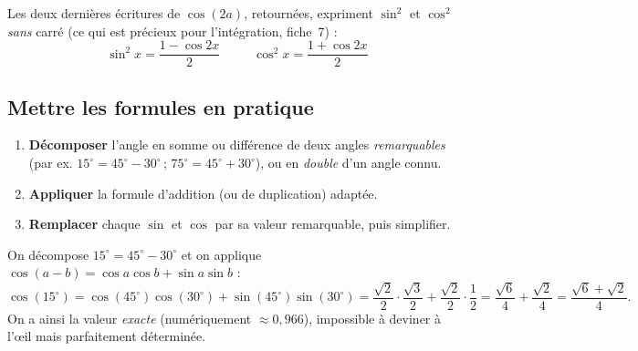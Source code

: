 \documentclass[11pt,a4paper]{article}
\newcommand{\degr}{^{\circ}}
\begin{document}
\begin{remarque}
Les deux dernières écritures de $\cos(2a)$, retournées, expriment $\sin^2$ et $\cos^2$ \emph{sans}
carré (ce qui est précieux pour l'intégration, fiche~7) :
\[
\boxed{\;\sin^2 x=\frac{1-\cos2x}{2}\;}\qquad\boxed{\;\cos^2 x=\frac{1+\cos2x}{2}\;}
\]
\end{remarque}

\subsection{Mettre les formules en pratique}
\begin{methode}
\begin{enumerate}[leftmargin=1.7em,topsep=2pt,itemsep=2pt]
  \item \textbf{Décomposer} l'angle en somme ou différence de deux angles \emph{remarquables}
        (par ex. $15\degr=45\degr-30\degr$\,; $75\degr=45\degr+30\degr$), ou en \emph{double} d'un
        angle connu.
  \item \textbf{Appliquer} la formule d'addition (ou de duplication) adaptée.
  \item \textbf{Remplacer} chaque $\sin$ et $\cos$ par sa valeur remarquable, puis simplifier.
\end{enumerate}
\end{methode}

\begin{exemple}[valeur exacte de $\cos(15\degr)$]
On décompose $15\degr=45\degr-30\degr$ et on applique $\cos(a-b)=\cos a\cos b+\sin a\sin b$ :
\[
\cos(15\degr)=\cos(45\degr)\cos(30\degr)+\sin(45\degr)\sin(30\degr)
=\frac{\sqrt2}{2}\cdot\frac{\sqrt3}{2}+\frac{\sqrt2}{2}\cdot\frac12
=\frac{\sqrt6}{4}+\frac{\sqrt2}{4}=\frac{\sqrt6+\sqrt2}{4}.
\]
On a ainsi la valeur \emph{exacte} (numériquement $\approx0{,}966$), impossible à deviner à l'œil mais
parfaitement déterminée.
\end{exemple}
\end{document}
